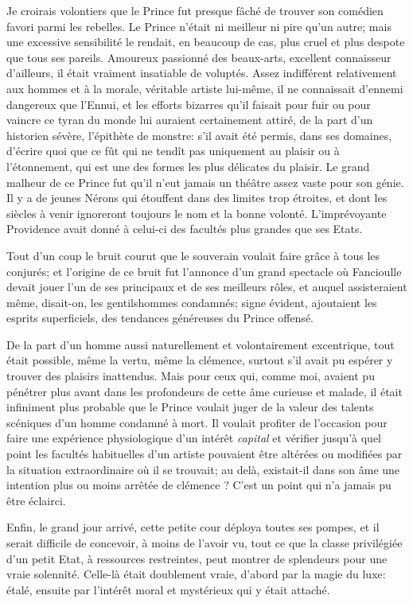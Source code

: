 Je croirais volontiers que le Prince fut presque fâché de trouver son
comédien favori parmi les rebelles. Le Prince n’était
ni meilleur ni pire qu’un autre; mais une excessive
sensibilité le rendait, en beaucoup de cas, plus cruel et plus despote
que tous ses pareils. Amoureux passionné des beaux{}-arts, excellent
connaisseur d’ailleurs, il était vraiment insatiable
de voluptés. Assez indifférent relativement aux hommes et à la morale,
véritable artiste lui{}-même, il ne connaissait
d’ennemi dangereux que l’Ennui, et
les efforts bizarres qu’il faisait pour fuir ou pour
vaincre ce tyran du monde lui auraient certainement attiré, de la part
d’un historien sévère, l’épithète de
monstre: s’il avait été permis, dans ses domaines,
d’écrire quoi que ce fût qui ne tendît pas uniquement
au plaisir ou à l’étonnement, qui est une des formes
les plus délicates du plaisir. Le grand malheur de ce Prince fut
qu’il n’eut jamais un théâtre assez
vaste pour son génie. Il y a de jeunes Nérons qui étouffent dans des
limites trop étroites, et dont les siècles à venir ignoreront toujours
le nom et la bonne volonté. L’imprévoyante Providence
avait donné à celui{}-ci des facultés plus grandes que ses Etats.

Tout d’un coup le bruit courut que le souverain voulait
faire grâce à tous les conjurés; et l’origine de ce
bruit fut l’annonce d’un grand
spectacle où Fancioulle devait jouer l’un de ses
principaux et de ses meilleurs rôles, et auquel assisteraient même,
disait{}-on, les gentilshommes condamnés; signe évident, ajoutaient les
esprits superficiels, des tendances généreuses du Prince offensé.

De la part d’un homme aussi naturellement et
volontairement excentrique, tout était possible, même la vertu, même la
clémence, surtout s’il avait pu espérer y trouver des
plaisirs inattendus. Mais pour ceux qui, comme moi, avaient pu pénétrer
plus avant dans les profondeurs de cette âme curieuse et malade, il
était infiniment plus probable que le Prince voulait juger de la valeur
des talents scéniques d’un homme condamné à mort. Il
voulait profiter de l’occasion pour faire une
expérience physiologique d’un intérêt \textit{capital} et
vérifier jusqu’à quel point les facultés habituelles
d’un artiste pouvaient être altérées ou modifiées par
la situation extraordinaire où il se trouvait; au delà, existait{}-il
dans son âme une intention plus ou moins arrêtée de clémence ?
C’est un point qui n’a jamais pu être
éclairci.

Enfin, le grand jour arrivé, cette petite cour déploya toutes ses
pompes, et il serait difficile de concevoir, à moins de
l’avoir vu, tout ce que la classe privilégiée
d’un petit Etat, à ressources restreintes, peut
montrer de splendeurs pour une vraie solennité. Celle{}-là était
doublement vraie, d’abord par la magie du luxe: étalé,
ensuite par l’intérêt moral et mystérieux qui y était
attaché.

